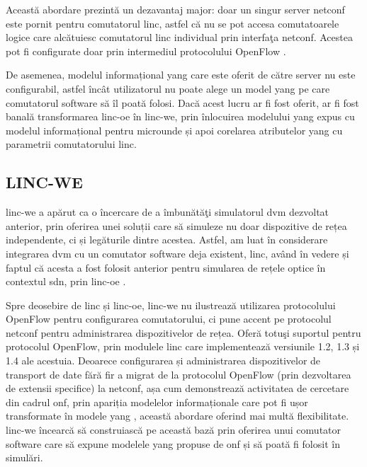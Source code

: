 Această abordare prezintă un dezavantaj major: doar un singur server \gls{netconf} este pornit pentru comutatorul \gls{linc}, astfel că nu se pot accesa comutatoarele logice care alcătuiesc comutatorul \gls{linc} individual prin interfaţa \gls{netconf}. Acestea pot fi configurate doar prin intermediul protocolului OpenFlow \cite{lincsw}.

De asemenea, modelul informațional \gls{yang} care este oferit de către server nu este configurabil, astfel încât utilizatorul nu poate alege un model \gls{yang} pe care comutatorul software să îl poată folosi. Dacă acest lucru ar fi fost oferit, ar fi fost banală transformarea \gls{linc-oe} în \gls{linc-we}, prin înlocuirea modelului \gls{yang} expus cu modelul informațional pentru microunde și apoi corelarea atributelor \gls{yang} cu parametrii comutatorului \gls{linc}.

\subsection{LINC-WE}

\gls{linc-we} a apărut ca o încercare de a îmbunătăţi simulatorul \gls{dvm} dezvoltat anterior, prin oferirea unei soluții care să simuleze nu doar dispozitive de rețea independente, ci și legăturile dintre acestea. Astfel, am luat în considerare integrarea \gls{dvm} cu un comutator software deja existent, \gls{linc}, având în vedere și faptul că acesta a fost folosit anterior pentru simularea de rețele optice în contextul \gls{sdn}, prin \gls{linc-oe} \cite{parulkar2015sdn}.

Spre deosebire de \gls{linc} și \gls{linc-oe}, \gls{linc-we} nu ilustrează utilizarea protocolului OpenFlow pentru configurarea comutatorului, ci pune accent pe protocolul \gls{netconf} pentru administrarea dispozitivelor de rețea. Oferă totuşi suportul pentru protocolul OpenFlow, prin modulele \gls{linc} care implementează versiunile 1.2, 1.3 și 1.4 ale acestuia. Deoarece configurarea și administrarea dispozitivelor de transport de date fără fir a migrat de la protocolul OpenFlow (prin dezvoltarea de extensii specifice) la \gls{netconf}, așa cum demonstrează activitatea de cercetare din cadrul \gls{onf}, prin apariția modelelor informaționale care pot fi ușor transformate în modele \gls{yang} \cite{onftr532, onftr512v1.0, onftr512v1.1, onftr512v1.2}, această abordare oferind mai multă flexibilitate. \gls{linc-we} încearcă să construiască pe această bază prin oferirea unui comutator software care să expune modelele \gls{yang} propuse de \gls{onf} și să poată fi folosit în simulări.

